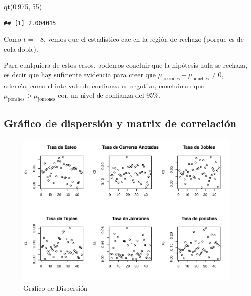 \documentclass{staprojteamusb}
\newenvironment{Shaded}{\begin{snugshade}}{\end{snugshade}}
\newcommand{\DecValTok}[1]{\textcolor[rgb]{0.00,0.00,0.81}{#1}}
\newcommand{\FloatTok}[1]{\textcolor[rgb]{0.00,0.00,0.81}{#1}}
\newcommand{\FunctionTok}[1]{\textcolor[rgb]{0.00,0.00,0.00}{#1}}
\newcommand{\NormalTok}[1]{#1}
\begin{document}
\begin{Shaded}
\begin{Highlighting}[]
\FunctionTok{qt}\NormalTok{(}\FloatTok{0.975}\NormalTok{, }\DecValTok{55}\NormalTok{)}
\end{Highlighting}
\end{Shaded}

\begin{verbatim}
## [1] 2.004045
\end{verbatim}

 Como \(t=-8\), vemos que el estadístico cae en la región de rechazo (porque es de cola doble).

 Para cualquiera de estos casos, podemos concluir que la hipótesis nula se rechaza, es decir que hay suficiente evidencia para creer que \(\mu_{\operatorname{jonrones}} - \mu_{\operatorname{ponches}} \neq 0\), además, como el intervalo de confianza es negativo, concluimos que \(\mu_{\operatorname{ponches}} > \mu_{\operatorname{jonrones}}\) con un nivel de confianza del \(95\%\).

 \hypertarget{gruxe1fico-de-dispersiuxf3n-y-matrix-de-correlaciuxf3n}{%
 \subsection{Gráfico de dispersión y matrix de correlación}\label{gruxe1fico-de-dispersiuxf3n-y-matrix-de-correlaciuxf3n}}

 \begin{figure}
 \centering
 \includegraphics{C03322-InformeFinal-Cordero-Gavazut-Riera_files/figure-latex/unnamed-chunk-12-1.pdf}
 \caption{\label{fig:unnamed-chunk-12}Gráfico de Dispersión}
 \end{figure}
\end{document}
